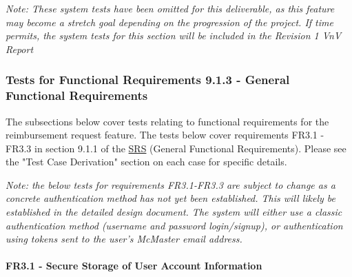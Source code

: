\documentclass[12pt, titlepage]{article}
\begin{document}
\textit{Note: These system tests have been omitted for this deliverable, as this feature may become a stretch goal depending on the progression of the project. If time permits, the system tests for this section will be included in the Revision 1 VnV Report}

\subsubsection{Tests for Functional Requirements 9.1.3 - General Functional Requirements}

The subsections below cover tests relating to functional requirements for the reimbursement request feature. The tests below cover requirements FR3.1 - FR3.3 in section 9.1.1 of the \href{https://shorturl.at/FdAgR}{SRS} (General Functional Requirements). Please see the "Test Case Derivation" section on each case for specific details.

\textit{Note: the below tests for requirements FR3.1-FR3.3 are subject to change as a concrete authentication method has not yet been established. This will likely be established in the detailed design document. The system will either use a classic authentication method (username and password login/signup), or authentication using tokens sent to the user's McMaster email address.}

\paragraph{FR3.1 - Secure Storage of User Account Information}
\end{document}
